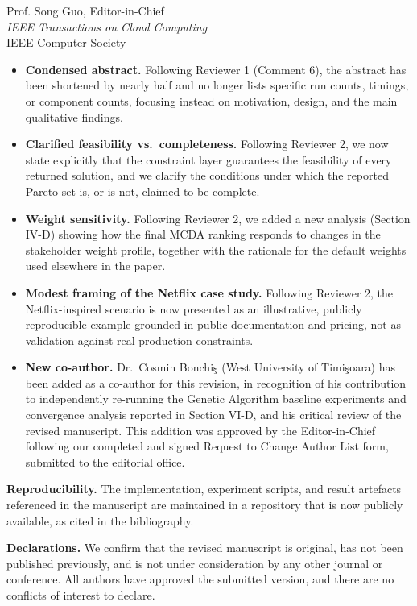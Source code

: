 \documentclass[12pt,a4paper]{letter}
\begin{document}
\begin{letter}{
  Prof. Song Guo, Editor-in-Chief \\
  \textit{IEEE Transactions on Cloud Computing} \\
  IEEE Computer Society
}
\begin{itemize}
        of a single pipeline (differing only in how latency is modelled),
        not as sequential software releases, to keep the focus on the
        research contribution rather than on version history.
  \item \textbf{Condensed abstract.} Following Reviewer 1 (Comment 6), the
        abstract has been shortened by nearly half and no longer lists
        specific run counts, timings, or component counts, focusing
        instead on motivation, design, and the main qualitative findings.
  \item \textbf{Clarified feasibility vs.\ completeness.} Following
        Reviewer 2, we now state explicitly that the constraint layer
        guarantees the feasibility of every returned solution, and we
        clarify the conditions under which the reported Pareto set is, or
        is not, claimed to be complete.
  \item \textbf{Weight sensitivity.} Following Reviewer 2, we added a new
        analysis (Section IV-D) showing how the final MCDA ranking responds
        to changes in the stakeholder weight profile, together with the
        rationale for the default weights used elsewhere in the paper.
  \item \textbf{Modest framing of the Netflix case study.} Following
        Reviewer 2, the Netflix-inspired scenario is now presented as an
        illustrative, publicly reproducible example grounded in public
        documentation and pricing, not as validation against real
        production constraints.
  \item \textbf{New co-author.} Dr.\ Cosmin Bonchi\c{s} (West University of
        Timi\c{s}oara) has been added as a co-author for this revision,
        in recognition of his contribution to independently re-running the
        Genetic Algorithm baseline experiments and convergence analysis
        reported in Section VI-D, and his critical review of the revised
        manuscript. This addition was approved by the Editor-in-Chief
        following our completed and signed Request to Change Author List
        form, submitted to the editorial office.
\end{itemize}

\bigskip
\textbf{Reproducibility.}
The implementation, experiment scripts, and result artefacts referenced in
the manuscript are maintained in a repository that is now publicly
available, as cited in the bibliography.

\bigskip
\textbf{Declarations.}
We confirm that the revised manuscript is original, has not been published
previously, and is not under consideration by any other journal or
conference. All authors have approved the submitted version, and there are
no conflicts of interest to declare.


\end{letter}
\end{document}
